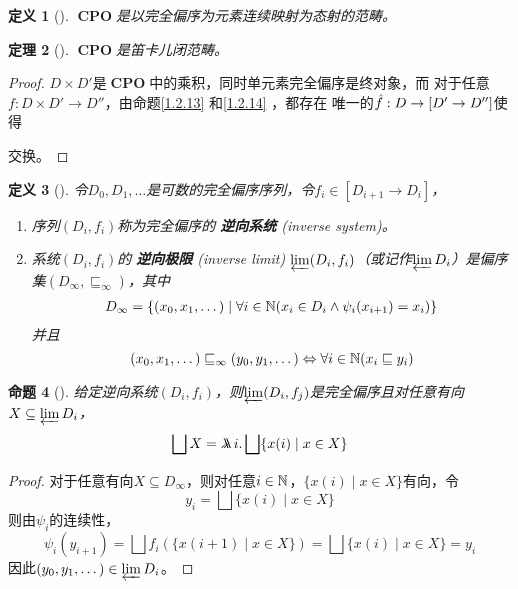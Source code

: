\documentclass[11pt]{article}
\DeclareMathOperator{\CPO}{\textbf{CPO}}
\newtheorem{theorem}{定理}[section]
\newtheorem{proposition}[theorem]{命题}
\newtheorem{definition}[theorem]{定义}
\begin{document}
\begin{definition}[]
\(\CPO\)是以完全偏序为元素连续映射为态射的范畴。
\end{definition}

\begin{theorem}[]
\(\CPO\)是笛卡儿闭范畴。
\end{theorem}

\begin{proof}
\(D\times D'\)是\(\CPO\)中的乘积，同时单元素完全偏序是终对象，而
对于任意\(f:D\times D'\to D''\)，由命题\ref{1.2.13} 和\ref{1.2.14} ，都存在
唯一的\(\hat{f}:D\to[D'\to D'']\)使得
\begin{center}\end{center}
交换。
\end{proof}

\begin{definition}[]
令\(D_0,D_1,\dots\)是可数的完全偏序序列，令\(f_i\in[D_{i+1}\to D_i]\)，
\begin{enumerate}
\item 序列\((D_i,f_i)\)称为完全偏序的 \textbf{逆向系统} (inverse system)。
\item 系统\((D_i,f_i)\)的 \textbf{逆向极限} (inverse limit) \(\varprojlim(D_i,f_i)\)（或记作\(\varprojlim D_i\)）是偏序集\((D_\infty,\sqsubseteq_\infty)\)，其中
\begin{align*}
D_\infty=\{(x_0,x_1,\dots)\mid\forall i\in\mathbb{N}(x_i\in D_i\wedge\psi_i(x_{i+1})=x_i)\}
\end{align*}
并且
\begin{equation*}
(x_0,x_1,\dots)\sqsubseteq_\infty(y_0,y_1,\dots)\Leftrightarrow\forall i\in\mathbb{N}(x_i\sqsubseteq y_i)
\end{equation*}
\end{enumerate}
\end{definition}

\begin{proposition}[]
给定逆向系统\((D_i,f_i)\)，则\(\varprojlim(D_i,f_j)\)是完全偏序且对任意有向\(X\subseteq\varprojlim D_i\)，
\begin{equation*}
\bigsqcup X=\metalambda i.\bigsqcup\{x(i)\mid x\in X\}
\end{equation*}
\end{proposition}

\begin{proof}
对于任意有向\(X\subseteq D_\infty\)，则对任意\(i\in\mathbb{N}\)，\(\{x(i)\mid x\in X\}\)有向，令
\begin{equation*}
y_i=\bigsqcup\{x(i)\mid x\in X\}
\end{equation*}
则由\(\psi_i\)的连续性，
\begin{equation*}
\psi_i(y_{i+1})=\bigsqcup f_i(\{x(i+1)\mid x\in X\})=\bigsqcup\{x(i)\mid x\in X\}=y_i
\end{equation*}
因此\((y_0,y_1,\dots)\in \varprojlim D_i\)。
\end{proof}
\end{document}
